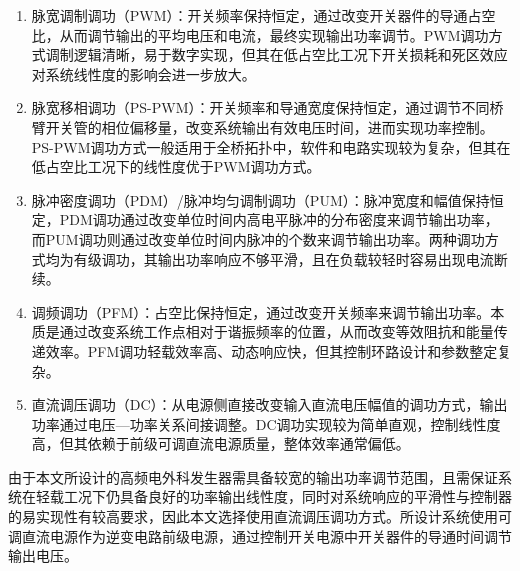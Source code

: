 \begin{enumerate}[topsep = 0 pt, itemsep= 0 pt, parsep=0pt, partopsep=0pt, leftmargin=44pt, itemindent=0pt, labelsep=6pt, label=(\arabic*)]
	\item 脉宽调制调功（PWM）：开关频率保持恒定，通过改变开关器件的导通占空比，从而调节输出的平均电压和电流，最终实现输出功率调节。PWM调功方式调制逻辑清晰，易于数字实现，但其在低占空比工况下开关损耗和死区效应对系统线性度的影响会进一步放大。
    \item 脉宽移相调功（PS-PWM）：开关频率和导通宽度保持恒定，通过调节不同桥臂开关管的相位偏移量，改变系统输出有效电压时间，进而实现功率控制。PS-PWM调功方式一般适用于全桥拓扑中，软件和电路实现较为复杂，但其在低占空比工况下的线性度优于PWM调功方式。
	\item 脉冲密度调功（PDM）/脉冲均匀调制调功（PUM）：脉冲宽度和幅值保持恒定，PDM调功通过改变单位时间内高电平脉冲的分布密度来调节输出功率，而PUM调功则通过改变单位时间内脉冲的个数来调节输出功率。两种调功方式均为有级调功，其输出功率响应不够平滑，且在负载较轻时容易出现电流断续。
	\item 调频调功（PFM）：占空比保持恒定，通过改变开关频率来调节输出功率。本质是通过改变系统工作点相对于谐振频率的位置，从而改变等效阻抗和能量传递效率。PFM调功轻载效率高、动态响应快，但其控制环路设计和参数整定复杂。
	\item 直流调压调功（DC）：从电源侧直接改变输入直流电压幅值的调功方式，输出功率通过电压—功率关系间接调整。DC调功实现较为简单直观，控制线性度高，但其依赖于前级可调直流电源质量，整体效率通常偏低。
\end{enumerate}

由于本文所设计的高频电外科发生器需具备较宽的输出功率调节范围，且需保证系统在轻载工况下仍具备良好的功率输出线性度，同时对系统响应的平滑性与控制器的易实现性有较高要求，因此本文选择使用直流调压调功方式。所设计系统使用可调直流电源作为逆变电路前级电源，通过控制开关电源中开关器件的导通时间调节输出电压。

